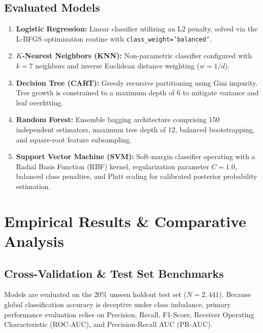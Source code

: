 \documentclass[11pt,a4paper]{article}
\begin{document}
\subsection{Evaluated Models}
\begin{enumerate}
    \item \textbf{Logistic Regression:} Linear classifier utilizing an L2 penalty, solved via the L-BFGS optimization routine with \texttt{class\_weight='balanced'}.
    \item \textbf{$K$-Nearest Neighbors (KNN):} Non-parametric classifier configured with $k=7$ neighbors and inverse Euclidean distance weighting ($w = 1/d$).
    \item \textbf{Decision Tree (CART):} Greedy recursive partitioning using Gini impurity. Tree growth is constrained to a maximum depth of 6 to mitigate variance and leaf overfitting.
    \item \textbf{Random Forest:} Ensemble bagging architecture comprising 150 independent estimators, maximum tree depth of 12, balanced bootstrapping, and square-root feature subsampling.
    \item \textbf{Support Vector Machine (SVM):} Soft-margin classifier operating with a Radial Basis Function (RBF) kernel, regularization parameter $C=1.0$, balanced class penalties, and Platt scaling for calibrated posterior probability estimation.
\end{enumerate}

\section{Empirical Results \& Comparative Analysis}

\subsection{Cross-Validation \& Test Set Benchmarks}
Models are evaluated on the 20\% unseen holdout test set ($N=2,441$). Because global classification accuracy is deceptive under class imbalance, primary performance evaluation relies on Precision, Recall, F1-Score, Receiver Operating Characteristic (ROC-AUC), and Precision-Recall AUC (PR-AUC).
\end{document}
